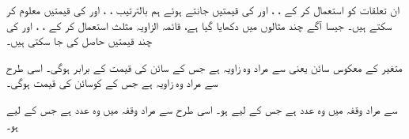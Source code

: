 ان تعلقات کو استعمال کر کے ، ، اور  کی قیمتیں جانتے ہوئے ہم بالترتیب ، ، اور  کی قیمتیں معلوم کر سکتے ہیں۔ جیسا آگے چند مثالوں میں دکھایا گیا ہے، قائمہ الزاویہ مثلث استعمال کر کے ، ، اور  کی چند قیمتیں حاصل کی جا سکتی ہیں۔

 متغیر  کے معکوس سائن یعنی  سے مراد وہ زاویہ ہے جس کے سائن  کی قیمت  کے برابر ہوگی۔ اسی طرح  سے مراد وہ زاویہ ہے جس کے کوسائن کی قیمت  ہوگی۔

 سے مراد وقفہ  میں وہ عدد  ہے جس کے لیے  ہو۔ اسی طرح 
 سے مراد وقفہ  میں وہ عدد  ہے جس کے لیے  ہو۔

